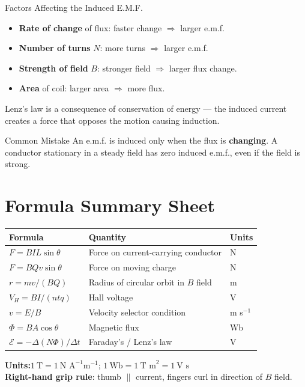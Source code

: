 \begin{keybox}{Factors Affecting the Induced E.M.F.}
\begin{itemize}[itemsep=2pt]
  \item \textbf{Rate of change} of flux: faster change $\Rightarrow$ larger e.m.f.
  \item \textbf{Number of turns} $N$: more turns $\Rightarrow$ larger e.m.f.
  \item \textbf{Strength of field} $B$: stronger field $\Rightarrow$ larger flux change.
  \item \textbf{Area} of coil: larger area $\Rightarrow$ more flux.
\end{itemize}
Lenz's law is a consequence of conservation of energy — the induced current creates a force that opposes the motion causing induction.
\end{keybox}

\begin{warningbox}{Common Mistake}
An e.m.f. is induced only when the flux is \textbf{changing}. A conductor stationary in a steady field has zero induced e.m.f., even if the field is strong.
\end{warningbox}

\section{Formula Summary Sheet}

\begin{minipage}{\linewidth}
\begin{tcolorbox}[colback=lightgold, colframe=accentgold]
\renewcommand{\arraystretch}{1.8}
\begin{tabular}{@{}lll@{}}
\toprule
\textbf{Formula} & \textbf{Quantity} & \textbf{Units} \\
\midrule
$F = BIL\sin\theta$ & Force on current-carrying conductor & N \\
$F = BQv\sin\theta$ & Force on moving charge & N \\
$r = mv/(BQ)$ & Radius of circular orbit in $B$ field & m \\
$V_H = BI/(ntq)$ & Hall voltage & V \\
$v = E/B$ & Velocity selector condition & m s$^{-1}$ \\
$\Phi = BA\cos\theta$ & Magnetic flux & Wb \\
$\mathcal{E} = -\Delta(N\Phi)/\Delta t$ & Faraday's / Lenz's law & V \\
\bottomrule
\end{tabular}
\end{tcolorbox}

\vspace{0.5em}
\begin{tcolorbox}[colback=lightblue, colframe=darkblue]
\textbf{Units:}\quad $1\ \text{T} = 1\ \text{N A}^{-1}\text{m}^{-1}$;\quad
$1\ \text{Wb} = 1\ \text{T m}^2 = 1\ \text{V s}$\\[0.3em]
\textbf{Right-hand grip rule}: thumb $\parallel$ current, fingers curl in direction of $B$ field.
\end{tcolorbox}
\end{minipage}

